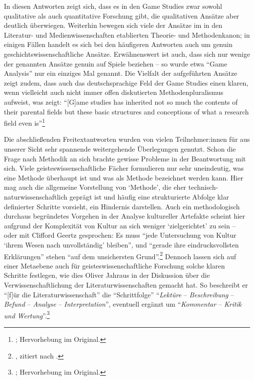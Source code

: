 \documentclass{scrartcl}
\begin{document}
In diesen Antworten zeigt sich, dass es in den Game Studies zwar sowohl qualitative als auch quantitative Forschung gibt, die qualitativen Ansätze aber deutlich überwiegen.
Weiterhin bewegen sich viele der Ansätze im in den Literatur- und Medienwissenschaften etablierten Theorie- und Methodenkanon; in einigen Fällen handelt es sich bei den häufigeren Antworten auch um genuin geschichtswissenschaftliche Ansätze.
Erwähnenswert ist auch, dass sich nur wenige der genannten Ansätze genuin auf Spiele beziehen -- so wurde etwa \enquote{Game Analysis} nur ein einziges Mal genannt.
Die Vielfalt der aufgeführten Ansätze zeigt zudem, dass auch das deutschsprachige Feld der Game Studies einen klaren, wenn vielleicht auch nicht immer offen diskutierten Methodenpluralismus aufweist, was zeigt:
\enquote{[G]ame studies has inherited not so much the contents of their parental fields but these basic structures and conceptions of what a research field even is}\footnote{\autocite[][S.~236]{unterhuber_parents_2025}; Hervorhebung im Original.}

Die abschließenden Freitextantworten wurden von vielen Teilnehmer:innen für aus unserer Sicht sehr spannende weitergehende Überlegungen genutzt.
Schon die Frage nach Methodik an sich brachte gewisse Probleme in der Beantwortung mit sich.
Viele geisteswissenschaftliche Fächer formulieren nur sehr uneindeutig, was eine Methode überhaupt ist und was als Methode bezeichnet werden kann.
Hier mag auch die allgemeine Vorstellung von \enquote*{Methode}, die eher technisch-naturwissenschaftlich geprägt ist und häufig eine strukturierte Abfolge klar definierter Schritte vorsieht, ein Hindernis darstellen.
Auch ein methodologisch durchaus begründetes Vorgehen in der Analyse kultureller Artefakte scheint hier aufgrund der Komplexität von Kultur an sich weniger \enquote*{zielgerichtet} zu sein -- oder mit Clifford Geertz gesprochen:
Es muss \enquote{jede Untersuchung von Kultur \enquote{ihrem Wesen nach unvollständig} bleiben}, und \enquote{gerade ihre eindrucksvollsten Erklärungen} stehen \enquote{auf dem unsichersten Grund}.\footnote{\autocite[][S.~14]{geertz_dichte_1983}, zitiert nach \autocite[][S.~10]{wirth_voruberlegungen_2007}.}
Dennoch lassen sich auf einer Metaebene auch für geisteswissenschaftliche Forschung solche klaren Schritte festlegen, wie dies Oliver Jahraus in der Diskussion über die Verwissenschaftlichung der Literaturwissenschaften gemacht hat.
So beschreibt er \enquote{[f]ür die Literaturwissenschaft} die \enquote{Schrittfolge} \enquote{\textit{Lektüre} -- \textit{Beschreibung} -- \textit{Befund} -- \textit{Analyse} -- \textit{Interpretation}}, eventuell ergänzt um \enquote{\textit{Kommentar} -- \textit{Kritik und Wertung}}.\footnote{\autocite[][S.~222]{jahraus_literaturtheorie_2004}; Hervorhebung im Original.}
\end{document}
